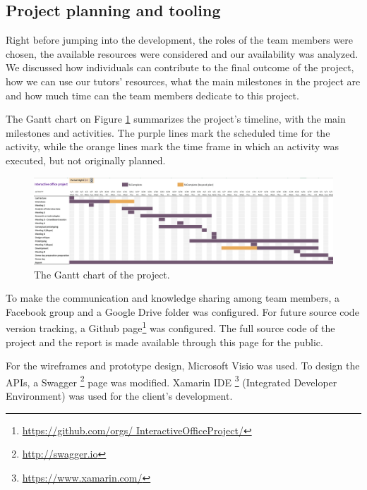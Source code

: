 \subsection{Project planning and tooling}
Right before jumping into the development, the roles of the team members were chosen, the available resources were 
considered and our availability was analyzed. We discussed how individuals can contribute to the final outcome of the 
project, how we can use our tutors' resources, what the main milestones in the project are and how much time can the 
team members dedicate to this project. 

The Gantt chart on Figure \ref{gantt-chart} summarizes the project's timeline, with the main milestones and 
activities. The purple lines mark the scheduled time for the activity, while the orange lines mark the time frame in 
which an activity was executed, but not originally planned.
 
\begin{figure}[h] 
		\begin{center}
			\includegraphics[width=1\textwidth]{images/gantt-chart.png}
			\caption{The Gantt chart of the project.}
			\label{gantt-chart}
		\end{center}
	\end{figure} 
 
To make the communication and knowledge sharing among team members, a Facebook group and a Google Drive folder was 
configured. For future source code version tracking, a Github page\footnote{\url{https://github.com/orgs/
InteractiveOfficeProject/}} was configured. The full source code of the project and the report is made available 
through this page for the public. 

For the wireframes and prototype design, Microsoft Visio was used. To design the APIs, a Swagger \footnote{\url{http://swagger.io}} 
page was modified. Xamarin IDE \footnote{\url{https://www.xamarin.com/}} (Integrated Developer 
Environment) was used for the client's development.

